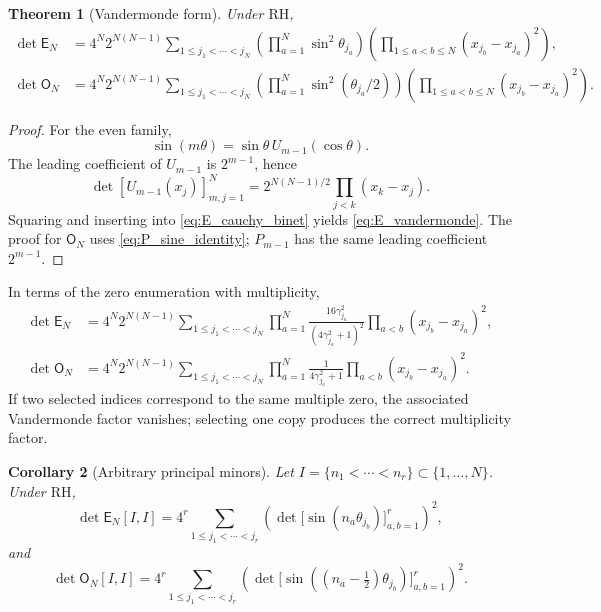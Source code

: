 \documentclass[11pt]{amsart}
\numberwithin{equation}{section}
\theoremstyle{plain}
\newtheorem{theorem}{Theorem}[section]
\newtheorem{corollary}[theorem]{Corollary}
\theoremstyle{definition}
\theoremstyle{remark}
\newcommand{\RH}{\mathrm{RH}}
\newcommand{\E}{\mathsf E}
\newcommand{\Omat}{\mathsf O}
\begin{document}
\begin{theorem}[Vandermonde form]
\label{thm:vandermonde_form}
Under $\RH$,
\begin{align}
\det\E_N
&=4^N2^{N(N-1)}
\sum_{1\le j_1<\cdots<j_N}
\left(\prod_{a=1}^N\sin^2\theta_{j_a}\right)
\left(\prod_{1\le a<b\le N}(x_{j_b}-x_{j_a})^2\right),
\label{eq:E_vandermonde}\\
\det\Omat_N
&=4^N2^{N(N-1)}
\sum_{1\le j_1<\cdots<j_N}
\left(\prod_{a=1}^N\sin^2(\theta_{j_a}/2)\right)
\left(\prod_{1\le a<b\le N}(x_{j_b}-x_{j_a})^2\right).
\label{eq:O_vandermonde}
\end{align}
\end{theorem}

\begin{proof}
For the even family,
\begin{equation}
\sin(m\theta)=\sin\theta\,U_{m-1}(\cos\theta).
\label{eq:sin_U_factor}
\end{equation}
The leading coefficient of $U_{m-1}$ is $2^{m-1}$, hence
\begin{equation}
\det[U_{m-1}(x_j)]_{m,j=1}^{N}
=2^{N(N-1)/2}\prod_{j<k}(x_k-x_j).
\label{eq:U_vandermonde}
\end{equation}
Squaring and inserting into \eqref{eq:E_cauchy_binet} yields \eqref{eq:E_vandermonde}. The proof for $\Omat_N$ uses \eqref{eq:P_sine_identity}; $P_{m-1}$ has the same leading coefficient $2^{m-1}$.
\end{proof}

In terms of the zero enumeration with multiplicity,
\begin{align}
\det\E_N
&=4^N2^{N(N-1)}
\sum_{1\le j_1<\cdots<j_N}
\prod_{a=1}^N\frac{16\gamma_{j_a}^2}{(4\gamma_{j_a}^2+1)^2}
\prod_{a<b}(x_{j_b}-x_{j_a})^2,
\label{eq:E_vandermonde_gamma}\\
\det\Omat_N
&=4^N2^{N(N-1)}
\sum_{1\le j_1<\cdots<j_N}
\prod_{a=1}^N\frac{1}{4\gamma_{j_a}^2+1}
\prod_{a<b}(x_{j_b}-x_{j_a})^2.
\label{eq:O_vandermonde_gamma}
\end{align}
If two selected indices correspond to the same multiple zero, the associated Vandermonde factor vanishes; selecting one copy produces the correct multiplicity factor.

\begin{corollary}[Arbitrary principal minors]
\label{cor:arbitrary_principal_minor_formula}
Let $I=\{n_1<\cdots<n_r\}\subset\{1,\dots,N\}$. Under $\RH$,
\begin{equation}
\det \E_N[I,I]
=4^r\sum_{1\le j_1<\cdots<j_r}
\left(\det\bigl[\sin(n_a\theta_{j_b})\bigr]_{a,b=1}^r\right)^2,
\label{eq:E_arbitrary_principal_minor}
\end{equation}
and
\begin{equation}
\det \Omat_N[I,I]
=4^r\sum_{1\le j_1<\cdots<j_r}
\left(\det\bigl[\sin((n_a-\tfrac12)\theta_{j_b})\bigr]_{a,b=1}^r\right)^2.
\label{eq:O_arbitrary_principal_minor}
\end{equation}
\end{corollary}
\end{document}
